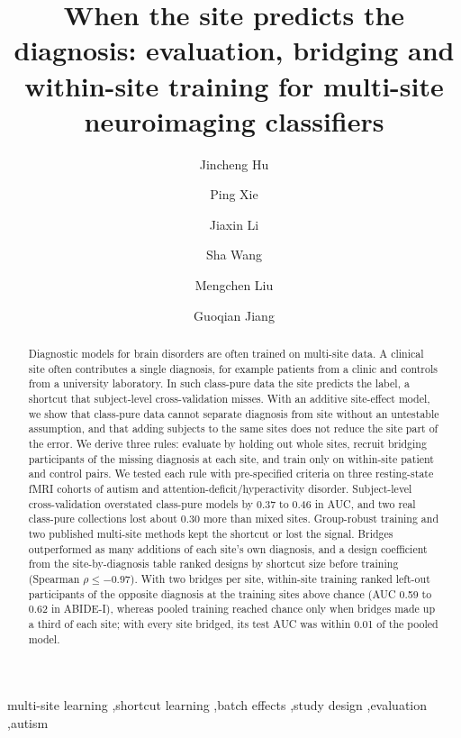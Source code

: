 \documentclass[preprint,10pt]{elsarticle}
\begin{document}
\begin{frontmatter}
\title{When the site predicts the diagnosis: evaluation, bridging and within-site training for multi-site neuroimaging classifiers}
\author[ee]{Jincheng Hu}
\author[ee,klicn,hebei]{Ping Xie}
\author[ee]{Jiaxin Li}
\author[ee]{Sha Wang}
\author[ee]{Mengchen Liu}
\author[ee,klicn]{Guoqian Jiang}
\begin{abstract}
Diagnostic models for brain disorders are often trained on multi-site data. A clinical site often contributes a single diagnosis, for example patients from a clinic and controls from a university laboratory. In such class-pure data the site predicts the label, a shortcut that subject-level cross-validation misses. With an additive site-effect model, we show that class-pure data cannot separate diagnosis from site without an untestable assumption, and that adding subjects to the same sites does not reduce the site part of the error. We derive three rules: evaluate by holding out whole sites, recruit bridging participants of the missing diagnosis at each site, and train only on within-site patient and control pairs. We tested each rule with pre-specified criteria on three resting-state fMRI cohorts of autism and attention-deficit/hyperactivity disorder. Subject-level cross-validation overstated class-pure models by 0.37 to 0.46 in AUC, and two real class-pure collections lost about 0.30 more than mixed sites. Group-robust training and two published multi-site methods kept the shortcut or lost the signal. Bridges outperformed as many additions of each site's own diagnosis, and a design coefficient from the site-by-diagnosis table ranked designs by shortcut size before training (Spearman $\rho\le-0.97$). With two bridges per site, within-site training ranked left-out participants of the opposite diagnosis at the training sites above chance (AUC 0.59 to 0.62 in ABIDE-I), whereas pooled training reached chance only when bridges made up a third of each site; with every site bridged, its test AUC was within 0.01 of the pooled model.
\end{abstract}
\begin{keyword}
multi-site learning \sep shortcut learning \sep batch effects \sep study design \sep evaluation \sep autism
\end{keyword}
\end{frontmatter}
\end{document}
